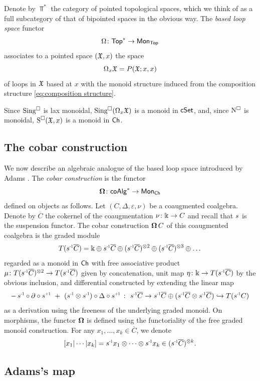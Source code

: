 Denote by $\Top^\ast$ the category of pointed topological spaces, which we think of as a full subcategory of that of bipointed spaces in the obvious way.
The \textit{based loop space} functor
\[
\Omega \colon \mathsf{Top}^\ast \to \mathsf{Mon}_{\mathsf{Top}}
\]
associates to a pointed space $(\mathfrak{X},x)$ the space
\[
\Omega_x \mathfrak{X} = P(\mathfrak{X};x,x)
\]
of loops in $\mathfrak{X}$ based at $x$ with the monoid structure induced from the composition structure \eqref{eq:composition structure}.

Since $\operatorname{Sing^{\square}}$ is lax monoidal, $\operatorname{Sing^{\square}}(\Omega_x \mathfrak{X})$ is a monoid in $\mathsf{cSet}$, and, since $\operatorname{N^{\square}}$ is monoidal, $\operatorname{S^{\square}}(\mathfrak{X},x)$ is a monoid in $\mathsf{Ch}$.

\subsection{The cobar construction}\label{ss:cobar construction}

We now describe an algebraic analogue of the based loop space introduced by Adams \cite{adams1956cobar}.
The \textit{cobar construction} is the functor
\[
\operatorname{\mathbf{\Omega}} \colon \mathsf{coAlg}^\ast \to \mathsf{Mon}_{\mathsf{Ch}}
\]
defined on objects as follows.
Let $(C, \Delta, \varepsilon, \nu)$ be a coaugmented coalgebra.
Denote by $\overline{C}$ the cokernel of the coaugmentation $\nu \colon \Bbbk \to C$ and recall that $\s{}$ is the suspension functor.
The cobar construction $\operatorname{\mathbf{\Omega}} C$ of this coaugmented coalgebra is the graded module
\[
T(\s{-1} \overline{C}) =
\k \oplus \s{-1}\overline{C} \oplus (\s{-1}\overline{C})^{\ot 2} \oplus (\s{-1}\overline{C})^{\ot 3} \oplus \dots
\]
regarded as a monoid in $\mathsf{Ch}$ with free associative product $\mu \colon T(\s{-1} \overline{C})^{\ot 2} \to T(\s{-1} \overline{C})$ given by concatenation, unit map $\eta \colon \k \to T(\s{-1} \overline{C})$ by the obvious inclusion, and differential constructed by extending the linear map
\[
-\, \s{-1} \circ \partial \circ \s{+1} \ + \ (\s{-1} \ot \s{-1}) \circ \Delta \circ \s{+1} \ \colon \
\s{-1} \overline{C} \to \s{-1}\overline{C} \oplus (\s{-1}\overline{C} \ot \s{-1}\overline{C}) \hookrightarrow T(\s{-1}C)
\]
as a derivation using the freeness of the underlying graded monoid.
On morphisms, the functor $\operatorname{\mathbf{\Omega}}$ is defined using the functoriality of the free graded monoid construction.
For any $x_1, \dots, x_k \in \overline{C}$, we denote
\[
[x_1| \cdots | x_k]= \s{-1} x_1 \otimes \cdots \otimes \s{-1}x_k \in (\s{-1}\overline{C})^{\otimes k}.
\]

\subsection{Adams's map}\label{ss:adams maps}

